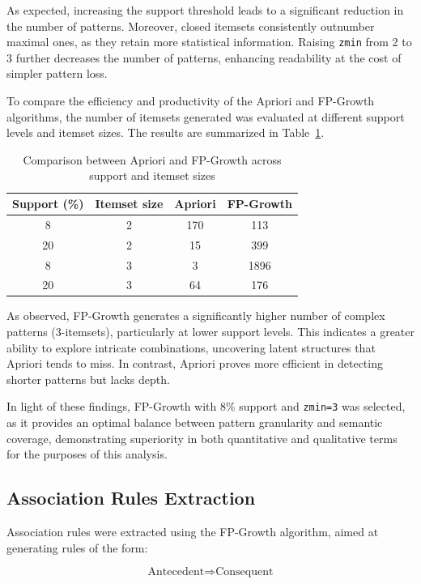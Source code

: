 \documentclass{article}
\begin{document}
As expected, increasing the support threshold leads to a significant reduction in the number of patterns. Moreover, closed itemsets consistently outnumber maximal ones, as they retain more statistical information. Raising \texttt{zmin} from 2 to 3 further decreases the number of patterns, enhancing readability at the cost of simpler pattern loss.

To compare the efficiency and productivity of the Apriori and FP-Growth algorithms, the number of itemsets generated was evaluated at different support levels and itemset sizes. The results are summarized in Table~\ref{tab:algo_comparison}.

\begin{table}[H]
\centering
\caption{Comparison between Apriori and FP-Growth across support and itemset sizes}
\label{tab:algo_comparison}
\begin{tabular}{|c|c|c|c|}
\hline
\textbf{Support (\%)} & \textbf{Itemset size} & \textbf{Apriori} & \textbf{FP-Growth} \\
\hline
8 & 2 & 170 & 113 \\
20 & 2 & 15 & 399 \\
8 & 3 & 3 & 1896 \\
20 & 3 & 64 & 176 \\
\hline
\end{tabular}
\end{table}

As observed, FP-Growth generates a significantly higher number of complex patterns (3-itemsets), particularly at lower support levels. This indicates a greater ability to explore intricate combinations, uncovering latent structures that Apriori tends to miss. In contrast, Apriori proves more efficient in detecting shorter patterns but lacks depth.

In light of these findings, FP-Growth with 8\% support and \texttt{zmin=3} was selected, as it provides an optimal balance between pattern granularity and semantic coverage, demonstrating superiority in both quantitative and qualitative terms for the purposes of this analysis.


\subsection{Association Rules Extraction}
Association rules were extracted using the FP-Growth algorithm, aimed at generating rules of the form:

\[
\text{Antecedent} \Rightarrow \text{Consequent}
\]
\end{document}
